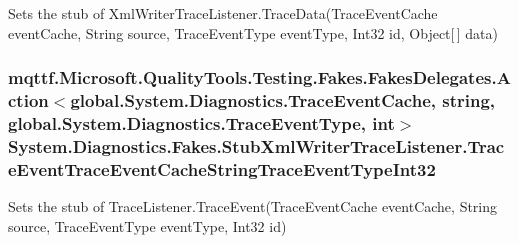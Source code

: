 Sets the stub of Xml\-Writer\-Trace\-Listener.\-Trace\-Data(\-Trace\-Event\-Cache event\-Cache, String source, Trace\-Event\-Type event\-Type, Int32 id, Object\mbox{[}$\,$\mbox{]} data)

\hypertarget{class_system_1_1_diagnostics_1_1_fakes_1_1_stub_xml_writer_trace_listener_a1a4d963b7e4f01c1488c18f3c623514e}{
\subsubsection[{Trace\-Event\-Trace\-Event\-Cache\-String\-Trace\-Event\-Type\-Int32}]{\setlength{\rightskip}{0pt plus 5cm}mqttf.\-Microsoft.\-Quality\-Tools.\-Testing.\-Fakes.\-Fakes\-Delegates.\-Action$<$global.\-System.\-Diagnostics.\-Trace\-Event\-Cache, string, global.\-System.\-Diagnostics.\-Trace\-Event\-Type, int$>$ System.\-Diagnostics.\-Fakes.\-Stub\-Xml\-Writer\-Trace\-Listener.\-Trace\-Event\-Trace\-Event\-Cache\-String\-Trace\-Event\-Type\-Int32}}\label{class_system_1_1_diagnostics_1_1_fakes_1_1_stub_xml_writer_trace_listener_a1a4d963b7e4f01c1488c18f3c623514e}


Sets the stub of Trace\-Listener.\-Trace\-Event(\-Trace\-Event\-Cache event\-Cache, String source, Trace\-Event\-Type event\-Type, Int32 id)

